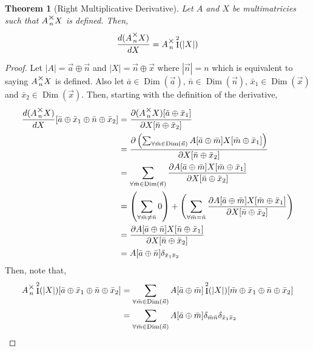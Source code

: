 \documentclass[12pt]{book}
\theoremstyle{plain}
\newtheorem{theorem}{Theorem}[chapter]
\theoremstyle{definition}
\theoremstyle{ppart}
\theoremstyle{case}
\theoremstyle{solution}
\DeclareMathOperator{\Dim}{Dim}
\DeclareMathOperator{\Ident}{I}
\newcommand{\mmult}[1]{\text{\raisebox{1ex}{$\underset{#1}{\times}$}}}
\begin{document}
\begin{theorem}[Right Multiplicative Derivative]
\label{right_mult_derivative}
Let $A$ and $X$ be multimatricies such that $A \mmult{n} X$ is
defined. Then,
\[ \frac{d(A \mmult{n} X)}{dX} = A \mmult{n} \Ident^2(|X|) \]
\end{theorem}
\begin{proof}
Let $|A| = \vec{a} \oplus \vec{n}$ and $|X| = \vec{n} \oplus \vec{x}$
where $|\vec{n}| = n$ which is equivalent to saying $A \mmult{n} X$ is defined.
Also let $\bar{a} \in \Dim(\vec{a})$, $\bar{n} \in \Dim(\vec{n})$,
$\bar{x}_1 \in \Dim(\vec{x})$ and $\bar{x}_2 \in \Dim(\vec{x})$.
Then, starting with the definition of the derivative,
\begin{align*}
  \frac{d(A\mmult{n}X)}{dX}[\bar{a} \oplus \bar{x}_1 \oplus \bar{n} \oplus \bar{x}_2]
  &=
  \frac{
    \partial (A \mmult{n} X)[\bar{a} \oplus \bar{x}_1]
  }{
    \partial X[\bar{n} \oplus \bar{x}_2]
  } \\
  &=
  \frac{
    \partial \left(
      \sum_{\forall \bar{m} \in \Dim(\vec{n})}
        A[\bar{a} \oplus \bar{m}]
        X[\bar{m} \oplus \bar{x}_1]
    \right)
  }{
    \partial X[\bar{n} \oplus \bar{x}_2]
  } \\
  &=
  \sum_{\forall \bar{m} \in \Dim(\vec{n})}
    \frac{
      \partial 
      A[\bar{a} \oplus \bar{m}]
      X[\bar{m} \oplus \bar{x}_1]
    }{
      \partial X[\bar{n} \oplus \bar{x}_2]
    } \\
  &=
  \left(
    \sum_{\forall \bar{m} \ne \bar{n}} 0
  \right)
  +
  \left(
    \sum_{\forall \bar{m} = \bar{n}}
    \frac{
      \partial 
      A[\bar{a} \oplus \bar{m}]
      X[\bar{m} \oplus \bar{x}_1]
    }{
      \partial X[\bar{n} \oplus \bar{x}_2]
    }
  \right) \\
  &=
  \frac{
    \partial 
    A[\bar{a} \oplus \bar{n}]
    X[\bar{n} \oplus \bar{x}_1]
  }{
    \partial X[\bar{n} \oplus \bar{x}_2]
  } \\
  &= A[\bar{a} \oplus \bar{n}] \delta_{\bar{x}_1 \bar{x}_2}
\end{align*}
Then, note that,
\begin{align*}
  A \mmult{n} \Ident^2(|X|)[\bar{a} \oplus \bar{x}_1 \oplus \bar{n} \oplus \bar{x}_2]
  &=
  \sum_{\forall \bar{m} \in \Dim(\vec{n})}
  A[\bar{a} \oplus \bar{m}]
  \Ident^2(|X|)[\bar{m} \oplus \bar{x}_1 \oplus \bar{n} \oplus \bar{x}_2] \\
  &=
  \sum_{\forall \bar{m} \in \Dim(\vec{n})}
  A[\bar{a} \oplus \bar{m}]
  \delta_{\bar{m} \bar{n}}
  \delta_{\bar{x}_1 \bar{x}_2} \\

\end{align*}
\end{proof}
\end{document}
